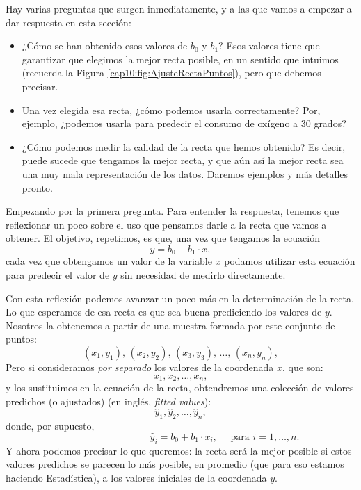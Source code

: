 Hay varias preguntas que surgen inmediatamente, y a las que vamos a empezar a dar respuesta en esta sección:
\begin{itemize}
  \item ¿Cómo se han obtenido esos valores de $b_0$ y $b_1$? Esos valores tiene que garantizar que elegimos la mejor recta posible, en un sentido que intuimos (recuerda la Figura \ref{cap10:fig:AjusteRectaPuntos}), pero que debemos precisar.
  \item Una vez elegida esa recta, ¿cómo podemos usarla correctamente? Por, ejemplo, ¿podemos usarla para predecir el consumo de oxígeno a $30$ grados?
  \item ¿Cómo podemos medir la calidad de la recta que hemos obtenido? Es decir, puede sucede que tengamos la mejor recta, y que aún así la mejor recta sea una muy mala representación de los datos. Daremos ejemplos y más detalles pronto.
\end{itemize}

Empezando por la primera pregunta. Para entender la respuesta, tenemos que reflexionar un poco sobre el uso que pensamos darle a la recta que vamos a obtener. El objetivo, repetimos, es que, una vez que tengamos la ecuación
\[y=b_0+b_1\cdot x,\]
cada vez que obtengamos un valor de la variable $x$ podamos utilizar esta ecuación para
predecir el valor de $y$ sin necesidad de medirlo directamente.

Con esta reflexión podemos avanzar un poco más en la determinación de la recta. Lo que
esperamos de esa recta es que sea buena prediciendo los valores de $y$. Nosotros la
obtenemos a partir de una muestra formada por este conjunto de puntos:
\[(x_1,y_1),\, (x_2,y_2),\, (x_3,y_3),\, \ldots,\, (x_n,y_n),\]
Pero si consideramos {\em por separado} los valores de la coordenada $x$, que son:
\[x_1, x_2,\ldots, x_n,\]
y los sustituimos en la ecuación de la recta, obtendremos una colección de {\sf valores
predichos (o ajustados)} (en inglés, {\em fitted values}):
\[\hat y_1, \hat y_2, \ldots, \hat y_n,\]
donde, por supuesto,
\begin{equation}
\label{cap10:ecu:FittedValues}
    \phantom{123456123456123456}\hat y_i=b_0+b_1\cdot x_i,\quad\mbox{ para }i=1,\ldots,n.
\end{equation}
Y ahora podemos precisar lo que queremos: la recta será la mejor posible si estos valores
predichos se parecen lo más posible, en promedio (que para eso estamos haciendo Estadística), a los valores iniciales de la coordenada $y$.

